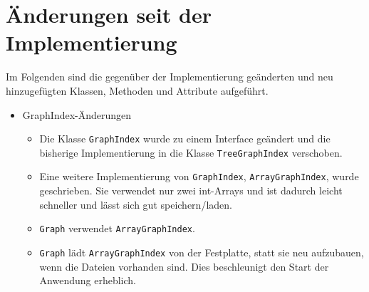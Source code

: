 \documentclass[a4paper, 11pt]{article}
\newcommand{\code}[1]{\texttt{#1}}
\begin{document}
\section{Änderungen seit der Implementierung}
Im Folgenden sind die gegenüber der Implementierung geänderten und neu hinzugefügten Klassen, Methoden und Attribute aufgeführt.

\begin{itemize}
\item GraphIndex-Änderungen
  \begin{itemize}
  \item Die Klasse \code{GraphIndex} wurde zu einem Interface geändert und die bisherige Implementierung in die Klasse \code{TreeGraphIndex} verschoben.
  \item Eine weitere Implementierung von \code{GraphIndex}, \code{ArrayGraphIndex}, wurde geschrieben.
    Sie verwendet nur zwei int-Arrays und ist dadurch leicht schneller und lässt sich gut speichern/laden.
  \item \code{Graph} verwendet \code{ArrayGraphIndex}.
  \item \code{Graph} lädt \code{ArrayGraphIndex} von der Festplatte, statt sie neu aufzubauen, wenn die Dateien vorhanden sind. Dies beschleunigt den Start der Anwendung erheblich.
  \end{itemize}
\end{itemize}

\makeatletter
{}
\makeatother
\printglossary[type=main, title={Glossar}, toctitle={Glossar}, style=myAltlist]
\end{document}
